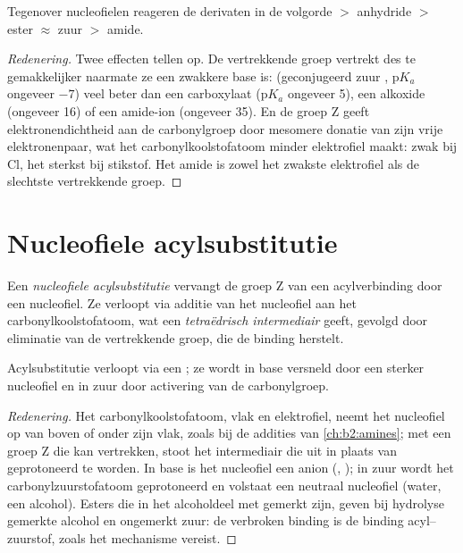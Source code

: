 \begin{proposition}[Reactiviteitsschaal]\label{prop:b2:acyl-substitution:reactivity}
Tegenover nucleofielen reageren de derivaten in de volgorde  $>$ anhydride $>$ ester
$\approx$ zuur $>$ amide.
\end{proposition}

\begin{proof}[Redenering]
Twee effecten tellen op. De vertrekkende groep  vertrekt des te gemakkelijker naarmate ze een zwakkere base is:
 (geconjugeerd zuur , $\mathrm pK_a$ ongeveer $-7$) veel beter dan een carboxylaat
($\mathrm pK_a$ ongeveer 5), een alkoxide (ongeveer 16) of een amide-ion (ongeveer 35). En de groep Z geeft
elektronendichtheid aan de carbonylgroep door mesomere donatie van zijn vrije elektronenpaar, wat het carbonylkoolstofatoom
minder elektrofiel maakt: zwak bij Cl, het sterkst bij stikstof. Het amide is zowel het zwakste
elektrofiel als de slechtste vertrekkende groep.
\end{proof}

\section{Nucleofiele acylsubstitutie}

\begin{definition}\label{def:b2:acyl-substitution:nas}
Een \emph{nucleofiele acylsubstitutie} vervangt de groep Z
van een acylverbinding door een nucleofiel. Ze verloopt via additie van het nucleofiel aan het carbonylkoolstofatoom,
wat een \emph{tetraëdrisch intermediair} geeft, gevolgd door
eliminatie van de vertrekkende groep, die de binding  herstelt.
\end{definition}

\begin{proposition}\label{prop:b2:acyl-substitution:addition-elimination}
Acylsubstitutie verloopt via een ; ze wordt in base versneld door een sterker
nucleofiel en in zuur door activering van de carbonylgroep.
\end{proposition}

\begin{proof}[Redenering]
Het carbonylkoolstofatoom, vlak en elektrofiel, neemt het nucleofiel op van boven of onder zijn
vlak, zoals bij de addities van \cref{ch:b2:amines}; met een groep Z die kan vertrekken, stoot het intermediair
die uit in plaats van geprotoneerd te worden. In base is het nucleofiel een anion (,
); in zuur wordt het carbonylzuurstofatoom geprotoneerd en volstaat een neutraal nucleofiel (water, een alcohol).
Esters die in het alcoholdeel met  gemerkt zijn, geven bij hydrolyse gemerkte alcohol
en ongemerkt zuur: de verbroken binding is de binding acyl--zuurstof, zoals het mechanisme vereist.
\end{proof}

